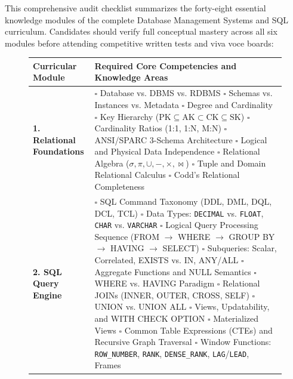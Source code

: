 This comprehensive audit checklist summarizes the forty-eight essential knowledge modules of the complete Database Management Systems and SQL curriculum. Candidates should verify full conceptual mastery across all six modules before attending competitive written tests and viva voce boards:

\begin{figure}[htbp]
\centering
\small
\begin{tabularx}{\textwidth}{l X}
\toprule
\textbf{Curricular Module} & \textbf{Required Core Competencies and Knowledge Areas} \\
\midrule
\textbf{1. Relational Foundations} & $\square$ Database vs. DBMS vs. RDBMS \quad $\square$ Schemas vs. Instances vs. Metadata \newline
$\square$ Degree and Cardinality \quad $\square$ Key Hierarchy ($\text{PK} \subseteq \text{AK} \subset \text{CK} \subseteq \text{SK}$) \newline
$\square$ Cardinality Ratios (1:1, 1:N, M:N) \quad $\square$ ANSI/SPARC 3-Schema Architecture \newline
$\square$ Logical and Physical Data Independence \quad $\square$ Relational Algebra ($\sigma, \pi, \cup, -, \times, \bowtie$) \newline
$\square$ Tuple and Domain Relational Calculus \quad $\square$ Codd's Relational Completeness \\
\midrule
\textbf{2. SQL Query Engine} & $\square$ SQL Command Taxonomy (DDL, DML, DQL, DCL, TCL) \newline
$\square$ Data Types: \texttt{DECIMAL} vs. \texttt{FLOAT}, \texttt{CHAR} vs. \texttt{VARCHAR} \newline
$\square$ Logical Query Processing Sequence (FROM $\to$ WHERE $\to$ GROUP BY $\to$ HAVING $\to$ SELECT) \newline
$\square$ Subqueries: Scalar, Correlated, EXISTS vs. IN, ANY/ALL \newline
$\square$ Aggregate Functions and NULL Semantics \quad $\square$ WHERE vs. HAVING Paradigm \newline
$\square$ Relational JOINs (INNER, OUTER, CROSS, SELF) \quad $\square$ UNION vs. UNION ALL \newline
$\square$ Views, Updatability, and WITH CHECK OPTION \quad $\square$ Materialized Views \newline
$\square$ Common Table Expressions (CTEs) and Recursive Graph Traversal \newline
$\square$ Window Functions: \texttt{ROW\_NUMBER}, \texttt{RANK}, \texttt{DENSE\_RANK}, \texttt{LAG}/\texttt{LEAD}, Frames \newline

\end{tabularx}
\end{figure}

